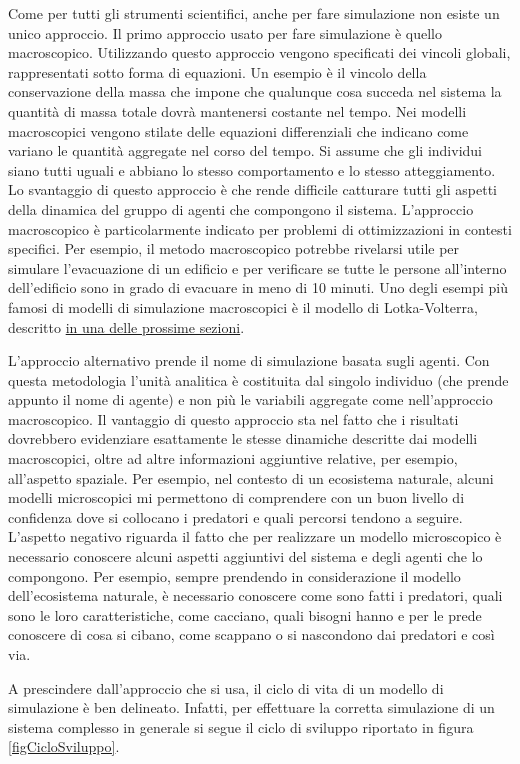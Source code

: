 \documentclass[11pt]{article}
\begin{document}
Come per tutti gli strumenti scientifici, anche per fare simulazione non esiste un unico approccio. Il primo approccio usato per fare simulazione è quello macroscopico. Utilizzando questo approccio vengono specificati dei vincoli globali, rappresentati sotto forma di equazioni. Un esempio è il vincolo della conservazione della massa che impone che qualunque cosa succeda nel sistema la quantità di massa totale dovrà mantenersi costante nel tempo. Nei modelli macroscopici vengono stilate delle equazioni differenziali che indicano come variano le quantità aggregate nel corso del tempo. Si assume che gli individui siano tutti uguali e abbiano lo stesso comportamento e lo stesso atteggiamento. Lo svantaggio di questo approccio è che rende difficile catturare tutti gli aspetti della dinamica del gruppo di agenti che compongono il sistema. L'approccio macroscopico è particolarmente indicato per problemi di ottimizzazioni in contesti specifici. Per esempio, il metodo macroscopico potrebbe rivelarsi utile per simulare l'evacuazione di un edificio e per verificare se tutte le persone all'interno dell'edificio sono in grado di evacuare in meno di 10 minuti.
Uno degli esempi più famosi di modelli di simulazione macroscopici è il modello di Lotka-Volterra, descritto \hyperref[sec:LV]{in una delle prossime sezioni}. 

L'approccio alternativo prende il nome di simulazione basata sugli agenti. Con questa metodologia l'unità analitica è costituita dal singolo individuo (che prende appunto il nome di agente) e non più le variabili aggregate come nell'approccio macroscopico. Il vantaggio di questo approccio sta nel fatto che i risultati dovrebbero evidenziare esattamente le stesse dinamiche descritte dai modelli macroscopici, oltre ad altre informazioni aggiuntive relative, per esempio, all'aspetto spaziale. Per esempio, nel contesto di un ecosistema naturale, alcuni modelli microscopici mi permettono di comprendere con un buon livello di confidenza dove si collocano i predatori e quali percorsi tendono a seguire. L'aspetto negativo riguarda il fatto che per realizzare un modello microscopico è necessario conoscere alcuni aspetti aggiuntivi del sistema e degli agenti che lo compongono. Per esempio, sempre prendendo in considerazione il modello dell'ecosistema naturale, è necessario conoscere come sono fatti i predatori, quali sono le loro caratteristiche, come cacciano, quali bisogni hanno e per le prede conoscere di cosa si cibano, come scappano o si nascondono dai predatori e così via. 

A prescindere dall'approccio che si usa, il ciclo di vita di un modello di simulazione è ben delineato. Infatti, per effettuare la corretta simulazione di un sistema complesso in generale si segue il ciclo di sviluppo riportato in figura \ref{figCicloSviluppo}.
\end{document}

